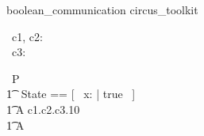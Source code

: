 \begin{zsection}
   \SECTION boolean\_communication \parents circus\_toolkit
\end{zsection}

\begin{circus}
   \circchannel\ c1, c2: \boolean \\
   \circchannel\ c3: \nat
\end{circus}

\begin{circus}
    \circprocess\ P \circdef \circbegin \\
    	\t1 \circstate\ State == [~ x: \nat | true ~] \\
        \t1 A \circdef c1.\true \then c2.\false \then c3.10 \then \Skip \\
        \t1 \circspot A \\
    \circend
\end{circus}

